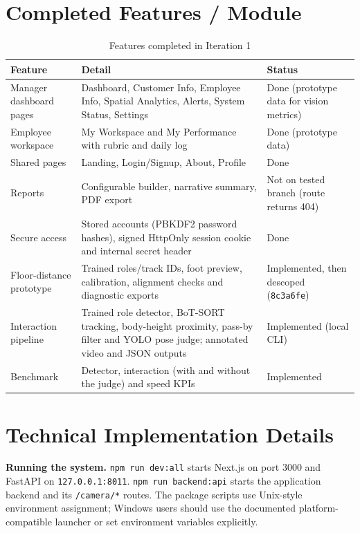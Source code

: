 \section{Completed Features / Module}
\begin{table}[H]
\centering
\caption{Features completed in Iteration 1}
\begin{tabular}{P{0.3\textwidth}P{0.4\textwidth}P{0.17\textwidth}}
\toprule
Feature & Detail & Status\\
\midrule
Manager dashboard pages & Dashboard, Customer Info, Employee Info, Spatial Analytics, Alerts, System Status, Settings & Done (prototype data for vision metrics)\\
Employee workspace & My Workspace and My Performance with rubric and daily log & Done (prototype data)\\
Shared pages & Landing, Login/Signup, About, Profile & Done\\
Reports & Configurable builder, narrative summary, PDF export & Not on tested branch (route returns 404)\\
Secure access & Stored accounts (PBKDF2 password hashes), signed HttpOnly session cookie and internal secret header & Done\\
Floor-distance prototype & Trained roles/track IDs, foot preview, calibration, alignment checks and diagnostic exports & Implemented, then descoped (\texttt{8c3a6fe})\\
Interaction pipeline & Trained role detector, BoT-SORT tracking, body-height proximity, pass-by filter and YOLO pose judge; annotated video and JSON outputs & Implemented (local CLI)\\
Benchmark & Detector, interaction (with and without the judge) and speed KPIs & Implemented\\
\bottomrule
\end{tabular}
\end{table}

\section{Technical Implementation Details}
\textbf{Running the system.} \texttt{npm run dev:all} starts Next.js on port 3000 and FastAPI on \texttt{127.0.0.1:8011}. \texttt{npm run backend:api} starts the application backend and its \texttt{/camera/*} routes. The package scripts use Unix-style environment assignment; Windows users should use the documented platform-compatible launcher or set environment variables explicitly.


